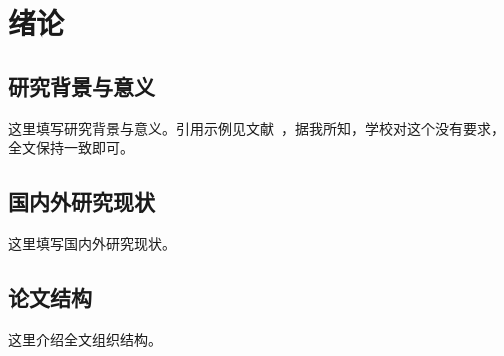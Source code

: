 \chapter{绪论}
\label{chapter:introduction}

\section{研究背景与意义}
这里填写研究背景与意义。引用示例见文献~\cite{example2024}，据我所知，学校对这个没有要求，全文保持一致即可。

\section{国内外研究现状}
这里填写国内外研究现状。

\section{论文结构}
这里介绍全文组织结构。
